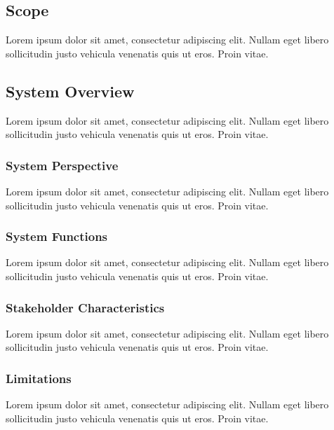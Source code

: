 \documentclass[a4paper]{article}
\begin{document}
            \subsection{Scope}

            Lorem ipsum dolor sit amet, consectetur adipiscing elit. Nullam eget libero sollicitudin justo vehicula venenatis quis ut eros. Proin vitae.

            \subsection{System Overview}

            Lorem ipsum dolor sit amet, consectetur adipiscing elit. Nullam eget libero sollicitudin justo vehicula venenatis quis ut eros. Proin vitae.

                \subsubsection{System Perspective}

                Lorem ipsum dolor sit amet, consectetur adipiscing elit. Nullam eget libero sollicitudin justo vehicula venenatis quis ut eros. Proin vitae.

                \subsubsection{System Functions}

                Lorem ipsum dolor sit amet, consectetur adipiscing elit. Nullam eget libero sollicitudin justo vehicula venenatis quis ut eros. Proin vitae.

                \subsubsection{Stakeholder Characteristics}

                Lorem ipsum dolor sit amet, consectetur adipiscing elit. Nullam eget libero sollicitudin justo vehicula venenatis quis ut eros. Proin vitae.

                \subsubsection{Limitations}

                Lorem ipsum dolor sit amet, consectetur adipiscing elit. Nullam eget libero sollicitudin justo vehicula venenatis quis ut eros. Proin vitae.
\end{document}
